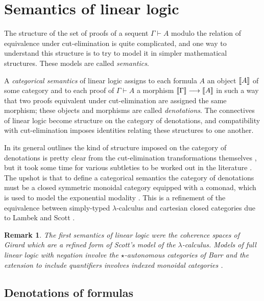 \documentclass[english,letter paper,12pt,reqno]{article}
\theoremstyle{example}
\newtheorem{remark}[theorem]{Remark}
\numberwithin{equation}{section}
\begin{document}
\section{Semantics of linear logic}\label{section:diagrammatics}

The structure of the set of proofs of a sequent $\Gamma \vdash A$ modulo the relation of equivalence under cut-elimination is quite complicated, and one way to understand this structure is to try to model it in simpler mathematical structures. These models are called \emph{semantics}.

A \emph{categorical semantics} of linear logic \cite{mellies, blue_book} assigns to each formula $A$ an object $\llbracket A \rrbracket$ of some category and to each proof of $\Gamma \vdash A$ a morphism $\llbracket \Gamma \rrbracket \longrightarrow \llbracket A \rrbracket$ in such a way that two proofs equivalent under cut-elimination are assigned the same morphism; these objects and morphisms are called \emph{denotations}. The connectives of linear logic become structure on the category of denotations, and compatibility with cut-elimination imposes identities relating these structures to one another.

In its general outlines the kind of structure imposed on the category of denotations is pretty clear from the cut-elimination transformations themselves \cite{??}, but it took some time for various subtleties to be worked out in the literature \cite{??,??,??}. The upshot is that to define a categorical semantics the category of denotations must be a closed symmetric monoidal category equipped with a comonad, which is used to model the exponential modality \cite[\S 7]{mellies}. This is a refinement of the equivalence between simply-typed $\lambda$-calculus and cartesian closed categories due to Lambek and Scott \cite{lambek}. 

\begin{remark} The first semantics of linear logic were the coherence spaces of Girard \cite[\S 3]{girard_llogic} which are a refined form of Scott's model of the $\lambda$-calculus. Models of full linear logic with negation involve the $\star$-autonomous categories of Barr \cite{barr_auto,barr_acc,barr_autolin} and the extension to include quantifiers involves indexed monoidal categories \cite{seely}.
\end{remark}

\subsection{Denotations of formulas}
\end{document}
